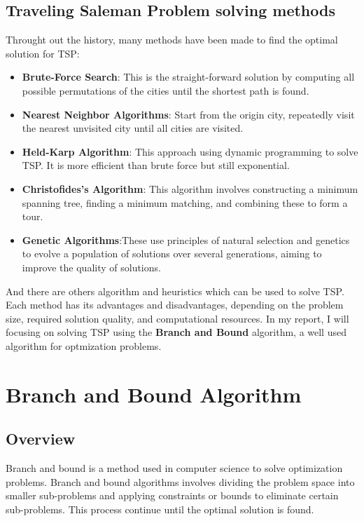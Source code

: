 \documentclass[a4paper]{article}
\begin{document}
\subsection{Traveling Saleman Problem solving methods}
Throught out the history, many methods have been made to find the optimal solution for TSP:
\begin{itemize}
    \item \textbf{Brute-Force Search}: This is the straight-forward solution by computing all possible permutations of the cities until the shortest path is found.
    \item \textbf{Nearest Neighbor Algorithms}: Start from the origin city, repeatedly visit the nearest unvisited city until all cities are visited.
    \item \textbf{Held-Karp Algorithm}: This approach using dynamic programming to solve TSP. It is more efficient than brute force but still exponential.  
    \item \textbf{Christofides's Algorithm}: This algorithm involves constructing a minimum spanning tree, finding a minimum matching, and combining these to form a tour. 
    \item \textbf{Genetic Algorithms}:These use principles of natural selection and genetics to evolve a population of solutions over several generations, aiming to improve the quality of solutions.
\end{itemize}
And there are others algorithm and heuristics which can be used to solve TSP. Each method has its advantages and disadvantages, depending on the problem size, required solution quality, and computational resources. In my report, I will focusing on solving TSP using the \textbf{Branch and Bound} algorithm, a well used algorithm for optmization problems.   
\section{Branch and Bound Algorithm}
\subsection{Overview}
Branch and bound is a method used in computer science to solve optimization problems. Branch and bound algorithms involves dividing the problem space into smaller sub-problems and applying constraints or bounds to eliminate certain sub-problems. This process continue until the optimal solution is found.
\end{document}
